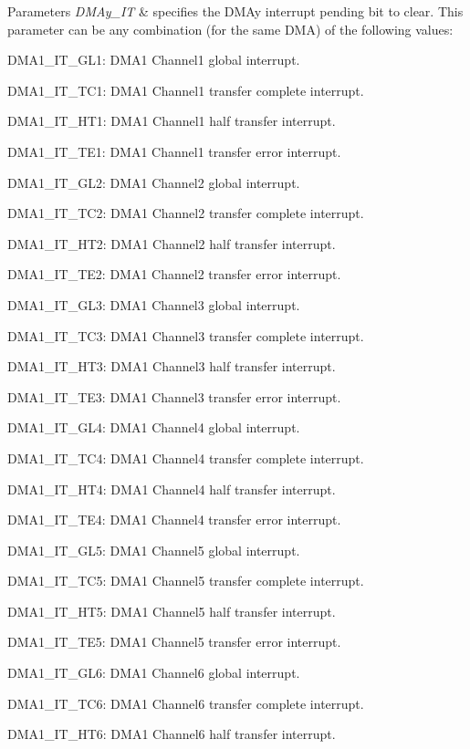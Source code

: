 \begin{DoxyParams}{Parameters}
{\em D\+M\+Ay\+\_\+\+IT} & specifies the D\+M\+Ay interrupt pending bit to clear. This parameter can be any combination (for the same D\+MA) of the following values\+: \begin{DoxyItemize}
\item D\+M\+A1\+\_\+\+I\+T\+\_\+\+G\+L1\+: D\+M\+A1 Channel1 global interrupt. \item D\+M\+A1\+\_\+\+I\+T\+\_\+\+T\+C1\+: D\+M\+A1 Channel1 transfer complete interrupt. \item D\+M\+A1\+\_\+\+I\+T\+\_\+\+H\+T1\+: D\+M\+A1 Channel1 half transfer interrupt. \item D\+M\+A1\+\_\+\+I\+T\+\_\+\+T\+E1\+: D\+M\+A1 Channel1 transfer error interrupt. \item D\+M\+A1\+\_\+\+I\+T\+\_\+\+G\+L2\+: D\+M\+A1 Channel2 global interrupt. \item D\+M\+A1\+\_\+\+I\+T\+\_\+\+T\+C2\+: D\+M\+A1 Channel2 transfer complete interrupt. \item D\+M\+A1\+\_\+\+I\+T\+\_\+\+H\+T2\+: D\+M\+A1 Channel2 half transfer interrupt. \item D\+M\+A1\+\_\+\+I\+T\+\_\+\+T\+E2\+: D\+M\+A1 Channel2 transfer error interrupt. \item D\+M\+A1\+\_\+\+I\+T\+\_\+\+G\+L3\+: D\+M\+A1 Channel3 global interrupt. \item D\+M\+A1\+\_\+\+I\+T\+\_\+\+T\+C3\+: D\+M\+A1 Channel3 transfer complete interrupt. \item D\+M\+A1\+\_\+\+I\+T\+\_\+\+H\+T3\+: D\+M\+A1 Channel3 half transfer interrupt. \item D\+M\+A1\+\_\+\+I\+T\+\_\+\+T\+E3\+: D\+M\+A1 Channel3 transfer error interrupt. \item D\+M\+A1\+\_\+\+I\+T\+\_\+\+G\+L4\+: D\+M\+A1 Channel4 global interrupt. \item D\+M\+A1\+\_\+\+I\+T\+\_\+\+T\+C4\+: D\+M\+A1 Channel4 transfer complete interrupt. \item D\+M\+A1\+\_\+\+I\+T\+\_\+\+H\+T4\+: D\+M\+A1 Channel4 half transfer interrupt. \item D\+M\+A1\+\_\+\+I\+T\+\_\+\+T\+E4\+: D\+M\+A1 Channel4 transfer error interrupt. \item D\+M\+A1\+\_\+\+I\+T\+\_\+\+G\+L5\+: D\+M\+A1 Channel5 global interrupt. \item D\+M\+A1\+\_\+\+I\+T\+\_\+\+T\+C5\+: D\+M\+A1 Channel5 transfer complete interrupt. \item D\+M\+A1\+\_\+\+I\+T\+\_\+\+H\+T5\+: D\+M\+A1 Channel5 half transfer interrupt. \item D\+M\+A1\+\_\+\+I\+T\+\_\+\+T\+E5\+: D\+M\+A1 Channel5 transfer error interrupt. \item D\+M\+A1\+\_\+\+I\+T\+\_\+\+G\+L6\+: D\+M\+A1 Channel6 global interrupt. \item D\+M\+A1\+\_\+\+I\+T\+\_\+\+T\+C6\+: D\+M\+A1 Channel6 transfer complete interrupt. \item D\+M\+A1\+\_\+\+I\+T\+\_\+\+H\+T6\+: D\+M\+A1 Channel6 half transfer interrupt. \item 
\end{DoxyItemize}
\end{DoxyParams}
